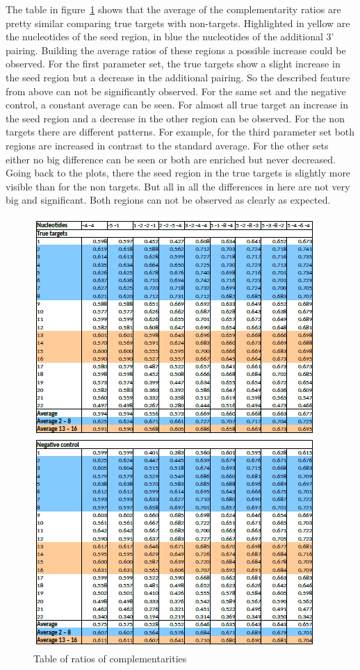 \documentclass[12pt]{article}
\begin{document}
The table in figure~\ref{table:ratios} shows that the average of the complementarity ratios are pretty similar comparing true targets with non-targets. Highlighted in yellow are the nucleotides of the seed region, in blue the nucleotides of the additional 3' pairing. Building the average ratios of these regions a possible increase could be observed. For the first parameter set, the true targets show a slight increase in the seed region but a decrease in the additional pairing. So the described feature from above can not be significantly observed. For the same set and the negative control, a constant average can be seen. For almost all true target an increase in the seed region and a decrease in the other region can be observed. For the non targets there are different patterns. For example, for the third parameter set both regions are increased in contrast to the standard average. For the other sets either no big difference can be seen or both are enriched but never decreased. Going back to the plots, there the seed region in the true targets is slightly more visible than for the non targets. But all in all the differences in here are not very big and significant. Both regions can not be observed as clearly as expected.  

\begin{figure}[h]
\centering
\includegraphics[scale=1.1]{results/ratio_table2.png}
\caption{Table of ratios of complementarities}
\label{table:ratios}
\end{figure}
\end{document}
